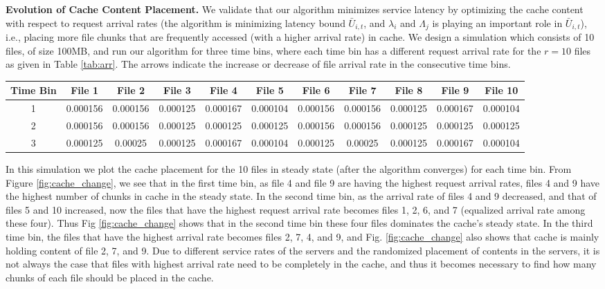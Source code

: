 {\bf Evolution of Cache Content Placement.} We validate that our algorithm minimizes service latency by optimizing the cache content with respect to request arrival rates (the algorithm is minimizing latency bound $\bar{U}_{i,t}$, and $\lambda_i$ and $\Lambda_j$ is playing an important role in $\bar{U}_{i,t}$), i.e., placing more file chunks that are frequently accessed (with a higher arrival rate) in cache. We design a simulation which consists of 10 files, of size 100MB, and run our algorithm for three time bins, where each time bin has a different request arrival rate for the $r=10$ files as given in Table \ref{tab:arr}. The arrows indicate the increase or decrease of file arrival rate in the consecutive time bins.
\begin{table*}
\caption{Table of arrival rates for 10 files in 3 time bins.} \label{tab:arr}
\centering
    \begin{tabular}{|c|c|c|c|c|c|c|c|c|c|c|}
    \hline
    Time Bin & File 1 & File 2 & File 3 & File 4 & File 5 & File 6 & File 7 & File 8 & File 9 & File 10 \\ \hline
    1 & 0.000156	& 0.000156 & 0.000125 & 0.000167 & 0.000104 & 0.000156 & 0.000156 & 0.000125 & 0.000167 & 0.000104 \\ \hline
    2 & 0.000156	& 0.000156 & 0.000125 & 0.000125 \color{red}{$\downarrow$} & 0.000125 \color{blue}{$\uparrow$} & 0.000156 & 0.000156 & 0.000125 & 0.000125 \color{red}{$\downarrow$} & 0.000125 \color{blue}{$\uparrow$} \\ \hline
    3 & 0.000125 \color{red}{$\downarrow$} & 0.00025 \color{blue}{$\uparrow$} & 0.000125 & 0.000167 & 0.000104 & 0.000125 \color{red}{$\downarrow$} & 0.00025 \color{blue}{$\uparrow$} & 0.000125 & 0.000167 & 0.000104 \\
    \hline
    \end{tabular}
    \vspace{-.25in}
\end{table*}
In this simulation we plot the cache placement for the 10 files in steady state (after the algorithm converges) for each time bin. From Figure \ref{fig:cache_change}, we see that in the first time bin, as file 4 and file 9 are having the highest request arrival rates, files 4 and  9 have the highest number of chunks in cache in the steady state. In the second time bin, as  the arrival rate of files 4 and 9 decreased, and  that of files 5 and 10 increased, now the files that have the highest request arrival rate becomes files 1, 2, 6, and 7 (equalized arrival rate among these four). Thus Fig \ref{fig:cache_change} shows that in the second time bin these four files dominates the cache's steady state. In the third time bin, the files that have the highest arrival rate becomes files 2, 7, 4, and 9, and Fig. \ref{fig:cache_change} also shows that cache is mainly holding content of file 2, 7, and 9. Due to different service rates of the servers and the randomized placement of contents in the servers, it is not always the case that files with highest arrival rate need to be completely in the cache, and thus it becomes necessary to find how many chunks of each file should be placed in the cache.
